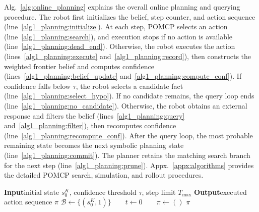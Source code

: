 Alg.~\ref{alg:online_planning} explains the overall online planning and querying procedure. The robot first initializes the belief, step counter, and action sequence (line~\ref{alg1_planning:initialize}). At each step, POMCP selects an action (line~\ref{alg1_planning:search}), and execution stops if no action is available (line~\ref{alg1_planning:dead_end}). Otherwise, the robot executes the action  (lines~\ref{alg1_planning:execute} and~\ref{alg1_planning:record}), then constructs the weighted frontier belief and computes confidence (lines~\ref{alg1_planning:belief_update} and~\ref{alg1_planning:compute_conf}). If confidence falls below $\tau$, the robot selects a candidate fact (line~\ref{alg1_planning:select_hypo}). If no candidate remains, the query loop ends (line~\ref{alg1_planning:no_candidate}). Otherwise, the robot obtains an external response and filters the belief (lines~\ref{alg1_planning:query} and~\ref{alg1_planning:filter}), then recomputes confidence (line~\ref{alg1_planning:recompute_conf}). After the query loop, the most probable remaining state becomes the next symbolic planning state (line~\ref{alg1_planning:commit}). The planner retains the matching search branch for the next step (line~\ref{alg1_planning:prune}). Appx.~\ref{appx:algorithms} provides the detailed POMCP search, simulation, and rollout procedures.

\begin{algorithm}[t]
\caption{Belief-Guided State Verification and Planning}
\label{alg:online_planning}
\DontPrintSemicolon
\textbf{Input}\quad initial state $s_0^{K}$, confidence threshold $\tau$, step limit $T_{\max}$\;
\textbf{Output}\quad executed action sequence $\pi$\;
\BlankLine
$\mathcal{B}\gets\{(s_0^{K},1)\}\qquad t\gets0\qquad \pi\gets()$\label{alg1_planning:initialize}\;
\KwRet $\pi$\label{alg1_planning:return}\;
\end{algorithm}

